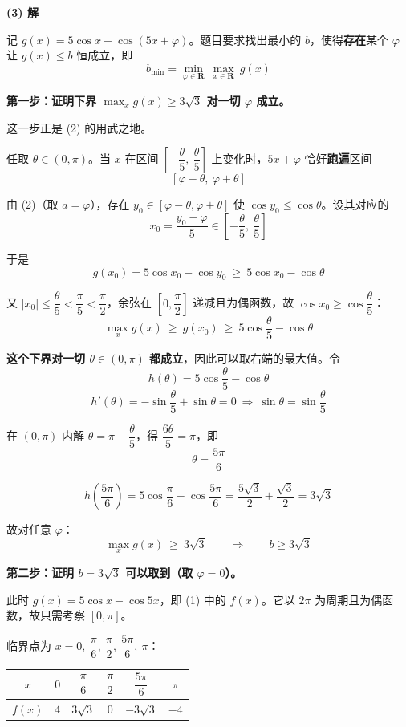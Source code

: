 \textbf{(3) 解}

记 $g(x)=5\cos x-\cos(5x+\varphi)$。题目要求找出最小的 $b$，使得\textbf{存在}某个 $\varphi$ 让 $g(x)\le b$ 恒成立，即
\[b_{\min}=\min_{\varphi\in\mathbf R}\ \max_{x\in\mathbf R}\ g(x)\]

\textbf{第一步：证明下界 $\max_x g(x)\ge3\sqrt3$ 对一切 $\varphi$ 成立。}

这一步正是 (2) 的用武之地。

任取 $\theta\in(0,\pi)$。当 $x$ 在区间 $\left[-\dfrac\theta5,\ \dfrac\theta5\right]$ 上变化时，$5x+\varphi$ 恰好\textbf{跑遍}区间
\[\left[\varphi-\theta,\ \varphi+\theta\right]\]

由 (2)（取 $a=\varphi$），存在 $y_0\in[\varphi-\theta,\varphi+\theta]$ 使 $\cos y_0\le\cos\theta$。设其对应的
\[x_0=\frac{y_0-\varphi}{5}\in\left[-\frac\theta5,\ \frac\theta5\right]\]

于是
\[g(x_0)=5\cos x_0-\cos y_0\ \ge\ 5\cos x_0-\cos\theta\]

又 $|x_0|\le\dfrac\theta5<\dfrac\pi5<\dfrac\pi2$，余弦在 $\left[0,\dfrac\pi2\right]$ 递减且为偶函数，故 $\cos x_0\ge\cos\dfrac\theta5$：
\[\max_{x}g(x)\ \ge\ g(x_0)\ \ge\ 5\cos\frac\theta5-\cos\theta\]

\textbf{这个下界对一切 $\theta\in(0,\pi)$ 都成立}，因此可以取右端的最大值。令
\[h(\theta)=5\cos\frac\theta5-\cos\theta\]
\[h'(\theta)=-\sin\frac\theta5+\sin\theta=0\ \Longrightarrow\ \sin\theta=\sin\frac\theta5\]

在 $(0,\pi)$ 内解 $\theta=\pi-\dfrac\theta5$，得 $\dfrac{6\theta}{5}=\pi$，即
\[\theta=\frac{5\pi}{6}\]

\[h\left(\frac{5\pi}{6}\right)=5\cos\frac\pi6-\cos\frac{5\pi}6=\frac{5\sqrt3}{2}+\frac{\sqrt3}{2}=3\sqrt3\]

故对任意 $\varphi$：
\[\max_x g(x)\ \ge\ 3\sqrt3\qquad\Longrightarrow\qquad b\ge3\sqrt3\]

\textbf{第二步：证明 $b=3\sqrt3$ 可以取到（取 $\varphi=0$）。}

此时 $g(x)=5\cos x-\cos5x$，即 (1) 中的 $f(x)$。它以 $2\pi$ 为周期且为偶函数，故只需考察 $[0,\pi]$。

临界点为 $x=0,\ \dfrac\pi6,\ \dfrac\pi2,\ \dfrac{5\pi}6,\ \pi$：

\begin{center}
\begin{tabular}{cccccc}
\toprule
$x$ & $0$ & $\dfrac\pi6$ & $\dfrac\pi2$ & $\dfrac{5\pi}6$ & $\pi$ \\
\midrule
$f(x)$ & $4$ & $3\sqrt3$ & $0$ & $-3\sqrt3$ & $-4$ \\
\bottomrule
\end{tabular}
\end{center}


